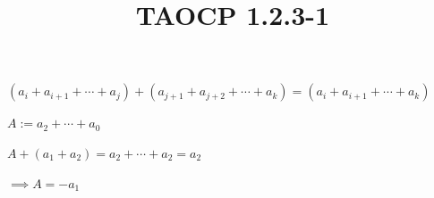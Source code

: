 \documentclass{article}
\title{TAOCP 1.2.3\mbox{-}1}
\begin{document}
\maketitle

\( (a_{i} + a_{i+1} + \cdots + a_{j}) + (a_{j+1} + a_{j+2} + \cdots + a_{k}) = (a_{i} + a_{i+1} + \cdots + a_{k}) \)

\( A := a_{2} + \cdots + a_{0} \)

\( A + (a_{1} + a_{2}) = a_{2} + \cdots + a_{2} = a_{2} \)

\( \implies A = -a_{1} \)
\end{document}
